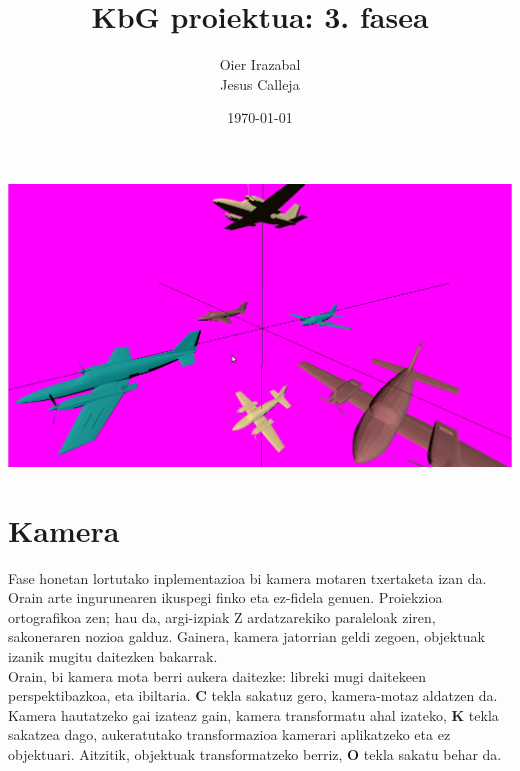 \documentclass[12pt]{article}
\title{KbG proiektua: 3. fasea}
\author{
        Oier Irazabal\\
        Jesus Calleja
}
\date{\today}
\newcommand{\tekla}[1] {\textbf{#1}}
\begin{document}
\maketitle


\tableofcontents

\vspace{0.7cm}
\begin{center}
\includegraphics[scale=0.24]{fase_34_portada.png}\\
\end{center}

\pagebreak

\section{Kamera}

Fase honetan lortutako inplementazioa bi kamera motaren txertaketa izan da. Orain arte ingurunearen ikuspegi finko eta ez-fidela genuen. Proiekzioa ortografikoa zen; hau da, argi-izpiak Z ardatzarekiko paraleloak ziren, sakoneraren nozioa galduz. Gainera, kamera jatorrian geldi zegoen, objektuak izanik mugitu daitezken bakarrak.\\

Orain, bi kamera mota berri aukera daitezke: libreki mugi daitekeen perspektibazkoa, eta ibiltaria. \tekla{C} tekla sakatuz gero, kamera-motaz aldatzen da. Kamera hautatzeko gai izateaz gain, kamera transformatu ahal izateko, \tekla{K} tekla sakatzea dago, aukeratutako transformazioa kamerari aplikatzeko eta ez objektuari. Aitzitik, objektuak transformatzeko berriz, \tekla{O} tekla sakatu behar da.\\
\end{document}
